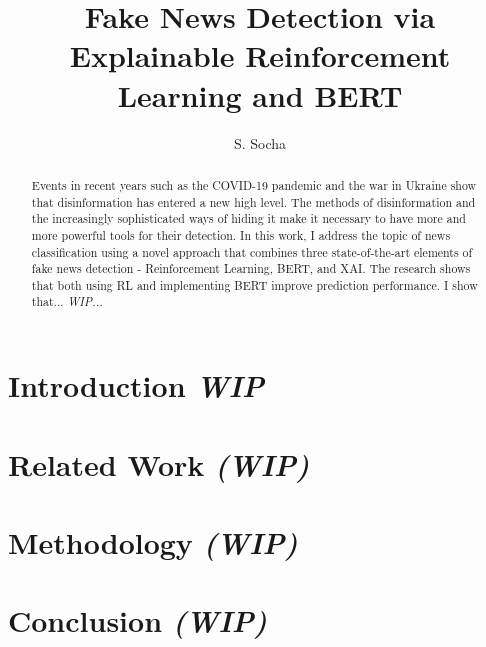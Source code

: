 \documentclass[
  journal=largetwo,
  manuscript=article-type,
  year=2023,
  volume=1,
]{cup-journal}
\title{Fake News Detection via Explainable Reinforcement Learning and BERT}
\author{S. Socha}
\affiliation{Faculty of Economic Sciences, University of Warsaw, Warsaw, Poland}
\begin{document}
\begin{abstract}
Events in recent years such as the COVID-19 pandemic and the war in Ukraine show that disinformation has entered a new high level. The methods of disinformation and the increasingly sophisticated ways of hiding it make it necessary to have more and more powerful tools for their detection. In this work, I address the topic of news classification using a novel approach that combines three state-of-the-art elements of fake news detection - Reinforcement Learning, BERT, and XAI. The research shows that both using RL and implementing BERT improve prediction performance. I show that... \textit{WIP...}
\end{abstract}


\section{Introduction \textit{WIP}}


\section{Related Work \textit{(WIP)}}


\section{Methodology \textit{(WIP)}}


\section{Conclusion \textit{(WIP)}}




\printendnotes

\printbibliography
\end{document}
